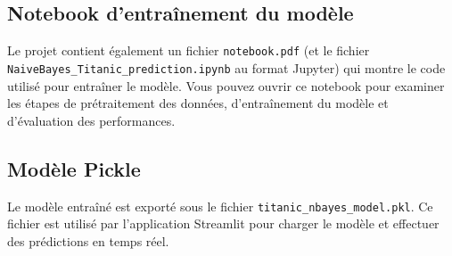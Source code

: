 \documentclass{rapportECL}
\begin{document}
\subsection*{Notebook d'entraînement du modèle}
Le projet contient également un fichier \texttt{notebook.pdf} (et le fichier \texttt{NaiveBayes\_Titanic\_prediction.ipynb} au format Jupyter) qui montre le code utilisé pour entraîner le modèle. Vous pouvez ouvrir ce notebook pour examiner les étapes de prétraitement des données, d'entraînement du modèle et d'évaluation des performances.

\subsection*{Modèle Pickle}
Le modèle entraîné est exporté sous le fichier \texttt{titanic\_nbayes\_model.pkl}. Ce fichier est utilisé par l'application Streamlit pour charger le modèle et effectuer des prédictions en temps réel.
\end{document}
